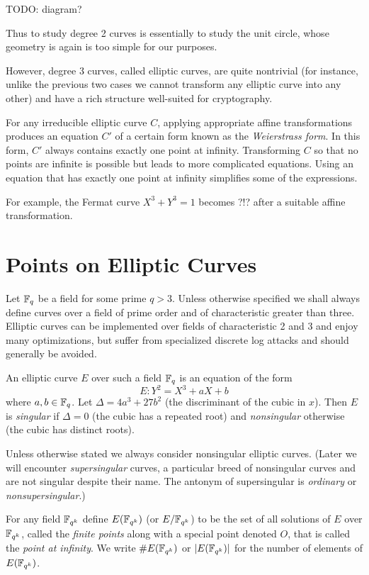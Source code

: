 TODO: diagram?

Thus to study degree 2 curves is essentially to study the unit circle,
whose geometry is again is too simple for our purposes.

However, degree 3 curves, called elliptic curves,
are quite nontrivial (for instance, unlike the previous two
cases we cannot transform any elliptic curve into
any other)
and have a rich structure well-suited for cryptography.

For any irreducible elliptic curve $C$,
applying appropriate affine transformations
produces an equation $C'$ of a certain form known
as the \emph{Weierstrass form}.
In this form, $C'$ always contains exactly one point at infinity.
Transforming $C$ so
that no points are infinite is
possible but leads to more complicated
equations. Using an equation that has
exactly one point at infinity simplifies some of the expressions.

For example, the Fermat curve $X^3 + Y^3 = 1$ becomes
?!? after a suitable affine transformation.

\section {Points on Elliptic Curves}

Let $\mathbb{F}_q$ be a field for some prime $q > 3$.
Unless otherwise specified we shall always
define curves over a field of prime order and of characteristic greater
than three.
Elliptic curves can be implemented over fields of characteristic 2 and 3
and enjoy many optimizations,
but suffer from specialized discrete log attacks and should generally
be avoided.

An elliptic curve $E$ over such a field $\mathbb{F}_q$ is an equation of the form
\[ E: Y^2 = X^3 + a X + b \]
where $a, b \in \mathbb{F}_q$.
Let $\Delta = 4 a^3 + 27b^2$ (the discriminant of the cubic in $x$). Then
$E$ is \emph{singular} if $\Delta = 0$ (the cubic has a repeated root)
and \emph{nonsingular} otherwise (the cubic has distinct roots).

Unless otherwise stated we always consider nonsingular elliptic curves.
(Later we will encounter \emph{supersingular} curves, a particular
breed of nonsingular curves and are not singular despite their name.
The antonym of supersingular is \emph{ordinary} or \emph{nonsupersingular}.)

For any field $\mathbb{F}_{q^k}$ define $E(\mathbb{F}_{q^k})$ (or $E/\mathbb{F}_{q^k}$)
to be the set of all solutions
of $E$ over $\mathbb{F}_{q^k}$, called the \emph{finite points}
along with a special point denoted $O$,
that is called the \emph{point at infinity}. We write $\#E(\mathbb{F}_{q^k})$ 
or $|E(\mathbb{F}_{q^k})|$ for
the number of elements of $E(\mathbb{F}_{q^k})$.

